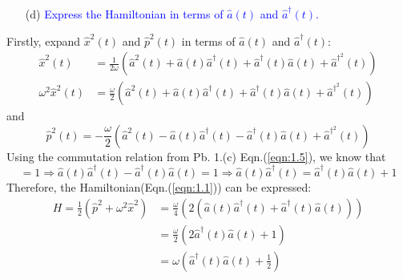 \documentclass[11pt, a4paper]{article}
\begin{document}
\newpage
\begin{enumerate}
    \item [(d)] \textcolor{blue}{
    Express the Hamiltonian in terms of $\hat{a}(t)$ and $\hat{a}^\dagger(t)$.
    }
\end{enumerate}
Firstly, expand $\hat{x}^2(t)$ and $\hat{p}^2(t)$ in terms of $\hat{a}(t)$ and $\hat{a}^\dagger(t)$:
\begin{align}
    \hat{x}^2(t) & = \frac{1}{2\omega} \left( \hat{a}^2(t) + \hat{a}(t)\hat{a}^\dagger(t) + \hat{a}^\dagger(t)\hat{a}(t) + \hat{a}^{\dagger^2}(t)\right) \\
    \omega^2 \hat{x}^2(t) & = \frac{\omega}{2} \left( \hat{a}^2(t) + \hat{a}(t)\hat{a}^\dagger(t) + \hat{a}^\dagger(t)\hat{a}(t) + \hat{a}^{\dagger^2}(t)\right)
\end{align}
and
\begin{equation}
    \hat{p}^2(t) = -\frac{\omega}{2} \left( \hat{a}^2(t) - \hat{a}(t)\hat{a}^\dagger(t) - \hat{a}^\dagger(t)\hat{a}(t) + \hat{a}^{\dagger^2}(t)\right)
\end{equation}
Using the commutation relation from Pb. 1.(c) Eqn.(\ref{eqn:1.5}), we know that
\begin{equation}
    [\hat{a}(t), \hat{a}^\dagger(t)] = 1 \Rightarrow \hat{a}(t)\hat{a}^\dagger(t) -\hat{a}^\dagger(t)\hat{a}(t) = 1 \Rightarrow \hat{a}(t)\hat{a}^\dagger(t) = \hat{a}^\dagger(t)\hat{a}(t) + 1
\end{equation}
Therefore, the Hamiltonian(Eqn.(\ref{eqn:1.1})) can be expressed:
\begin{align}
    H = \frac{1}{2} (\hat{p}^2 + \omega^2 \hat{x}^2) & = \frac{\omega}{4} \left( 2(\hat{a}(t)\hat{a}^\dagger(t) +\hat{a}^\dagger(t)\hat{a}(t)) \right)\\
    & = \frac{\omega}{2}\left( 2\hat{a}^\dagger(t)\hat{a}(t) + 1 \right)\\
    & = \omega \left( \hat{a}^\dagger(t)\hat{a}(t) + \frac{1}{2} \right)
\end{align}
\end{document}
